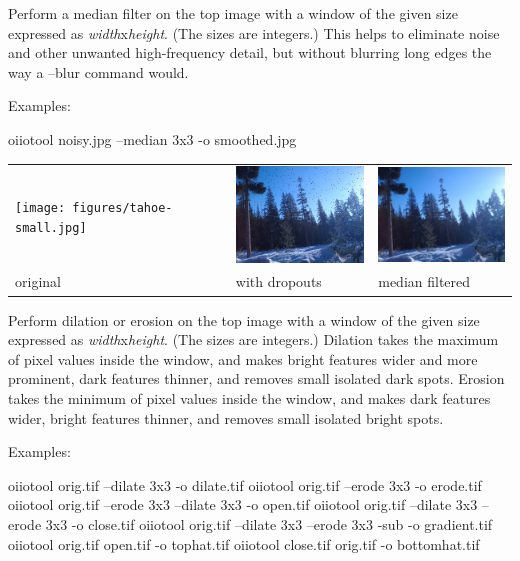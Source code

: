 Perform a median filter on the top image with a window of the given size
expressed as \emph{width}{\cf x}\emph{height}.  (The sizes are integers.)
This helps to eliminate noise and other unwanted high-frequency detail, but
without blurring long edges the way a {\cf --blur} command would.

\noindent Examples:
\begin{code}
    oiiotool noisy.jpg --median 3x3 -o smoothed.jpg
\end{code}

\spc \begin{tabular}{lll}
\texttt{[image: figures/tahoe-small.jpg]} &
\includegraphics[width=1.5in]{figures/tahoe-pepper.jpg} &
\includegraphics[width=1.5in]{figures/tahoe-pepper-median.jpg} \\
original & with dropouts & median filtered \\
\end{tabular}
\apiend


 

Perform dilation or erosion on the top image with a window of the given size
expressed as \emph{width}{\cf x}\emph{height}. (The sizes are integers.)
Dilation takes the maximum of pixel values inside the window, and makes
bright features wider and more prominent, dark features thinner, and removes
small isolated dark spots. Erosion takes the minimum of pixel values inside
the window, and makes dark features wider, bright features thinner, and
removes small isolated bright spots.

\noindent Examples:
\begin{code}
    oiiotool orig.tif --dilate 3x3 -o dilate.tif
    oiiotool orig.tif --erode 3x3 -o erode.tif
    oiiotool orig.tif --erode 3x3 --dilate 3x3 -o open.tif
    oiiotool orig.tif --dilate 3x3 --erode 3x3 -o close.tif
    oiiotool orig.tif --dilate 3x3 --erode 3x3 -sub -o gradient.tif
    oiiotool orig.tif open.tif -o tophat.tif
    oiiotool close.tif orig.tif -o bottomhat.tif
\end{code}

